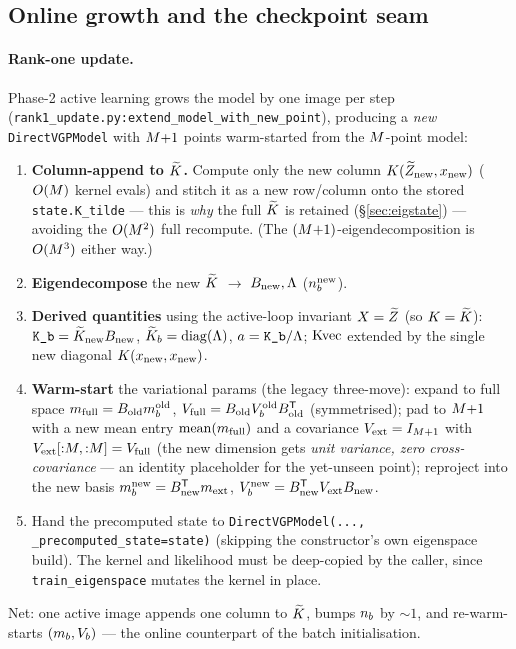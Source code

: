 \subsection{Online growth and the checkpoint seam}\label{sec:rank1}

\paragraph{Rank-one update.}
Phase-2 active learning grows the model by one image per step
(\texttt{rank1\_update.py:\allowbreak extend\_model\_with\_new\_point}), producing a
\emph{new} \texttt{DirectVGPModel} with $M{+}1$ points warm-started from the
$M$-point model:
\begin{enumerate}[nosep]
  \item \textbf{Column-append to $\widetilde{K}$.} Compute only the new column
    $K(\widetilde{Z}_{\text{new}},x_{\text{new}})$ ($O(M)$ kernel evals) and stitch
    it as a new row/column onto the stored \texttt{state.K\_tilde} --- this is
    \emph{why} the full $\widetilde{K}$ is retained (\S\ref{sec:eigstate}) --- avoiding
    the $O(M^2)$ full recompute. (The $(M{+}1)$-eigendecomposition is
    $O(M^3)$ either way.)
  \item \textbf{Eigendecompose} the new $\widetilde{K}$ $\to$ $B_{\text{new}},\Lambda$
    ($n_{b}^{\text{new}}$).
  \item \textbf{Derived quantities} using the active-loop invariant $X=\widetilde{Z}$
    (so $K=\widetilde{K}$): $\texttt{K\_b}=\widetilde{K}_{\text{new}}B_{\text{new}}$,
    $\widetilde{K}_{b}=\operatorname{diag}(\Lambda)$, $a=\texttt{K\_b}/\Lambda$; $\mathrm{Kvec}$ extended by the
    single new diagonal $K(x_{\text{new}},x_{\text{new}})$.
  \item \textbf{Warm-start} the variational params (the legacy three-move):
    expand to full space
    $m_{\text{full}}=B_{\text{old}}m_{b}^{\text{old}}$,
    $V_{\text{full}}=B_{\text{old}}V_{b}^{\text{old}}B_{\text{old}}^{\mathsf{T}}$
    (symmetrised); pad to $M{+}1$ with a new mean entry
    $\operatorname{mean}(m_{\text{full}})$ and a covariance
    $V_{\text{ext}}=I_{M+1}$ with $V_{\text{ext}}[{:}M,{:}M]=V_{\text{full}}$
    (the new dimension gets \emph{unit variance, zero cross-covariance} --- an
    identity placeholder for the yet-unseen point); reproject into the new basis
    $m_{b}^{\text{new}}=B_{\text{new}}^{\mathsf{T}}m_{\text{ext}}$,
    $V_{b}^{\text{new}}=B_{\text{new}}^{\mathsf{T}}V_{\text{ext}}B_{\text{new}}$.
  \item Hand the precomputed state to
    \texttt{DirectVGPModel(..., \_precomputed\_state=state)} (skipping the
    constructor's own eigenspace build). The kernel and likelihood must be
    deep-copied by the caller, since \texttt{train\_eigenspace} mutates the kernel
    in place.
\end{enumerate}
Net: one active image appends one column to $\widetilde{K}$, bumps $n_{b}$ by $\sim1$, and
re-warm-starts $(m_{b},V_{b})$ --- the online counterpart of the batch
initialisation.

